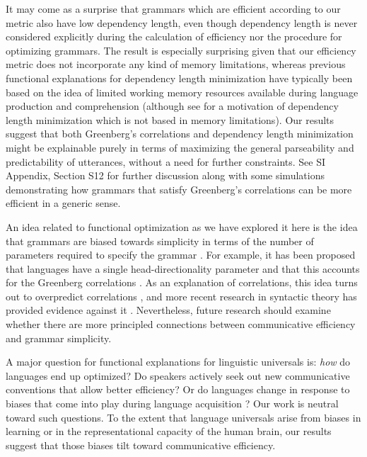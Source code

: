 \documentclass[9pt,twocolumn,twoside,lineno]{pnas-new}
\begin{document}
It may come as a surprise that grammars which are efficient according to our metric also have low dependency length, even though dependency length is never considered explicitly during the calculation of efficiency nor the procedure for optimizing grammars. The result is especially surprising given that our efficiency metric does not incorporate any kind of memory limitations, whereas previous functional explanations for dependency length minimization have typically been based on the idea of limited working memory resources available during language production and comprehension \citep{gibson1998linguistic,futrell2017noisycontext} (although see \citep{hawkins1994performance} for a motivation of dependency length minimization which is not based in memory limitations). Our results suggest that both Greenberg's correlations and dependency length minimization might be explainable purely in terms of maximizing the general parseability and predictability of utterances, without a need for further constraints. See SI Appendix, Section S12 for further discussion along with some simulations demonstrating how grammars that satisfy Greenberg's correlations can be more efficient in a generic sense.


An idea related to functional optimization as we have explored it here is the idea that grammars are biased towards simplicity in terms of the number of parameters required to specify the grammar \cite{culbertson2016simplicity}. 
For example, it has been proposed that languages have a single head-directionality parameter and that this accounts for the Greenberg correlations \cite{chomsky1993theory,baker2001atoms}.
As an explanation of correlations, this idea turns out to overpredict correlations \cite{dryer1992greenbergian,baker2008macroparameter}, and more recent research in syntactic theory has provided evidence against it \cite{kayne1994antisymmetry,kandybowicz2003directionality,kayne2011there}.
Nevertheless, future research should examine whether there are more principled connections between communicative efficiency and grammar simplicity.

A major question for functional explanations for linguistic universals is: \emph{how} do languages end up optimized? Do speakers actively seek out new communicative conventions that allow better efficiency? Or do languages change in response to biases that come into play during language acquisition \cite{fedzechkina2012language,culbertson2012learning}? Our work is neutral toward such questions. To the extent that language universals arise from biases in learning or in the representational capacity of the human brain, our results suggest that those biases tilt toward communicative efficiency. 
\end{document}
